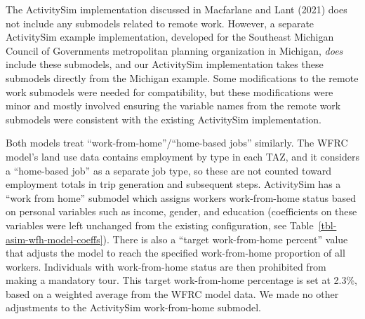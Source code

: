\documentclass[fancy, twoside, mastersfancy, ms]{byuthesis}
\begin{document}
The ActivitySim implementation discussed in Macfarlane and Lant (2021)
does not include any submodels related to remote work. However, a
separate ActivitySim example implementation, developed for the Southeast
Michigan Council of Governments metropolitan planning organization in
Michigan, \emph{does} include these submodels, and our ActivitySim
implementation takes these submodels directly from the Michigan example.
Some modifications to the remote work submodels were needed for
compatibility, but these modifications were minor and mostly involved
ensuring the variable names from the remote work submodels were
consistent with the existing ActivitySim implementation.

Both models treat ``work-from-home''/``home-based jobs'' similarly. The
WFRC model's land use data contains employment by type in each TAZ, and
it considers a ``home-based job'' as a separate job type, so these are
not counted toward employment totals in trip generation and subsequent
steps. ActivitySim has a ``work from home'' submodel which assigns
workers work-from-home status based on personal variables such as
income, gender, and education (coefficients on these variables were left
unchanged from the existing configuration, see
Table~\ref{tbl-asim-wfh-model-coeffs}). There is also a ``target
work-from-home percent'' value that adjusts the model to reach the
specified work-from-home proportion of all workers. Individuals with
work-from-home status are then prohibited from making a mandatory tour.
This target work-from-home percentage is set at 2.3\%, based on a
weighted average from the WFRC model data. We made no other adjustments
to the ActivitySim work-from-home submodel.
\end{document}
